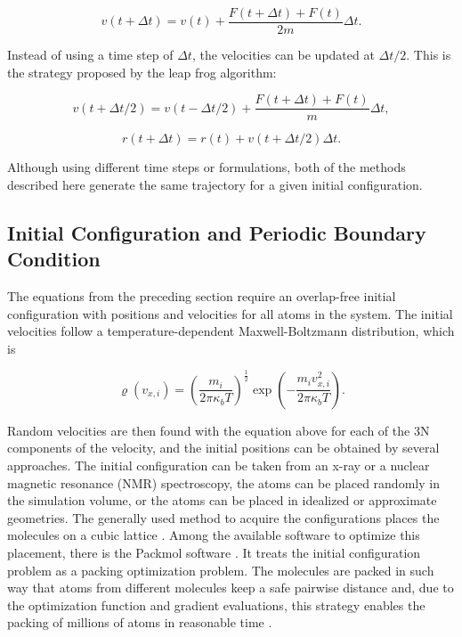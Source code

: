 \begin{equation}
v(t+ \Delta t) = v(t) +\frac{F(t+ \Delta t) +F(t)}{2m} \Delta t .
\end{equation}

Instead of using a time step of $\Delta t$, the velocities can be updated at $\Delta t /2$. This is the strategy proposed by the leap frog algorithm:

\begin{equation}
v(t+ \Delta t /2) = v(t- \Delta t /2) +\frac{F(t+ \Delta t) +F(t)}{m} \Delta t ,
\end{equation}

\begin{equation}
r(t+ \Delta t) = r(t) +v(t+ \Delta t /2) \Delta t .
\end{equation}

Although using different time steps or formulations, both of the methods described here generate the same trajectory for a given initial configuration.

\subsection{Initial Configuration and Periodic Boundary Condition} \label{icbc}

The equations from the preceding section require an overlap-free initial configuration with positions and velocities for all atoms in the system. The initial velocities follow a temperature-dependent Maxwell-Boltzmann distribution, which is

\begin{equation}
\varrho (v_{x,i}) = \left (\frac{m_{i}}{2 \pi \kappa_{b} T} \right )^{\frac{1}{2}} \exp \left (-\frac{m_{i}v_{x,i}^2}{2 \pi \kappa_{b} T} \right) .
\end{equation}

Random velocities are then found with the equation above for each of the 3N components of the velocity, and the initial positions can be obtained by several approaches. The initial configuration can be taken from an x-ray or a nuclear magnetic resonance (NMR) spectroscopy, the atoms can be placed randomly in the simulation volume, or the atoms can be placed in idealized or approximate geometries. The generally used method to acquire the configurations places the molecules on a cubic lattice \cite{shell2015}.  Among the available software to optimize this placement, there is the Packmol software \cite{packmol}. It treats the initial configuration problem as a packing optimization problem. The molecules are packed in such way that atoms from different molecules keep a safe pairwise distance and, due to the optimization function and gradient evaluations, this strategy enables the packing of millions of atoms in reasonable time \cite{packmol}.   

